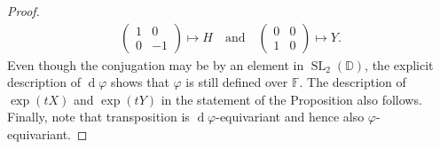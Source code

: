 \documentclass[12pt]{amsart}
\newcommand{\F}{\mathbb{F} }
\newcommand{\D}{\mathbb{D} }
\numberwithin{equation}{section}
\theoremstyle{remark} %
\begin{document}
\begin{proof}
\begin{align*}
\begin{pmatrix}
	                   		1 & 0 \\ 0 & -1
	                  	 	\end{pmatrix}   \mapsto   H   \quad \text{and} \quad
	                  	 	\begin{pmatrix}
	                  	 		0 & 0 \\ 1 & 0
	                  	 	\end{pmatrix}      \mapsto  Y    .
	 \end{align*}
	 Even though the conjugation may be by an element in $\operatorname{SL}_2(\D)$, the explicit description of $\operatorname{d}\!\varphi$ shows that $\varphi$ is still defined over $\F$. The description of $\exp(tX)$ and $\exp(tY)$ in the statement of the Proposition also follows. Finally, note that transposition is $\operatorname{d}\!\varphi$-equivariant and hence also $\varphi$-equivariant.
 \end{proof} 
\end{document}
